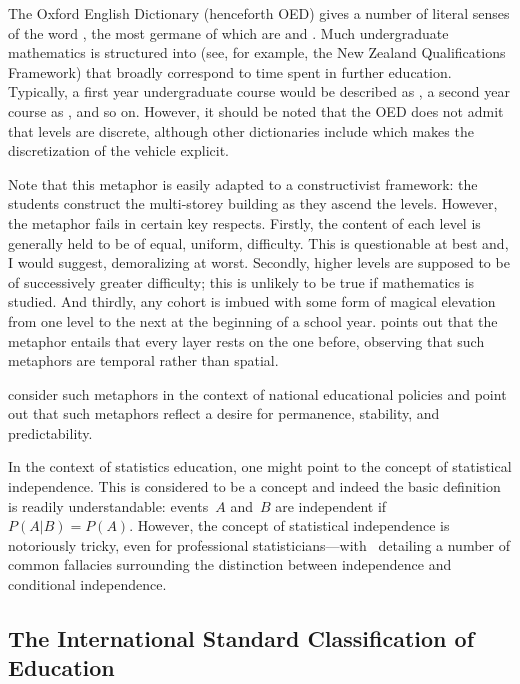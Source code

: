 The Oxford English Dictionary (henceforth OED) gives a number of
literal senses of the word , the most germane of which
are  and .  Much undergraduate mathematics is structured into
 (see, for example, the New Zealand Qualifications
Framework) that broadly correspond to time spent in further education.
Typically, a first year undergraduate course would be described as
, a second year course as , and so on.
However, it should be noted that the OED does not admit that levels
are discrete, although other dictionaries include  which makes the discretization of
the vehicle explicit.

Note that this metaphor is easily adapted to a constructivist
framework: the students construct the multi-storey building as they
ascend the levels.  However, the metaphor fails in certain key
respects.  Firstly, the content of each level is generally held to be
of equal, uniform, difficulty.  This is questionable at best and, I
would suggest, demoralizing at worst.  Secondly, higher levels are
supposed to be of successively greater difficulty; this is unlikely to
be true if  mathematics is studied.  And thirdly,
any cohort is imbued with some form of magical elevation from one
level to the next at the beginning of a school year.
 points out that the  metaphor
entails that every layer rests on the one before, observing that such
metaphors are temporal rather than spatial.

 consider such metaphors in the context of national
educational policies and point out that such metaphors reflect a
desire for permanence, stability, and predictability.

In the context of statistics education, one might point to the concept
of statistical independence.  This is considered to be a  concept and indeed the basic definition is readily
understandable: events~$A$ and~$B$ are independent
if~$P\left(A\left|B\right.\right)=P\left(A\right)$.  However, the
concept of statistical independence is notoriously tricky, even for
professional statisticians---with~ detailing a
number of common fallacies surrounding the distinction between
independence and conditional independence.


\subsection{The International Standard Classification of Education}

